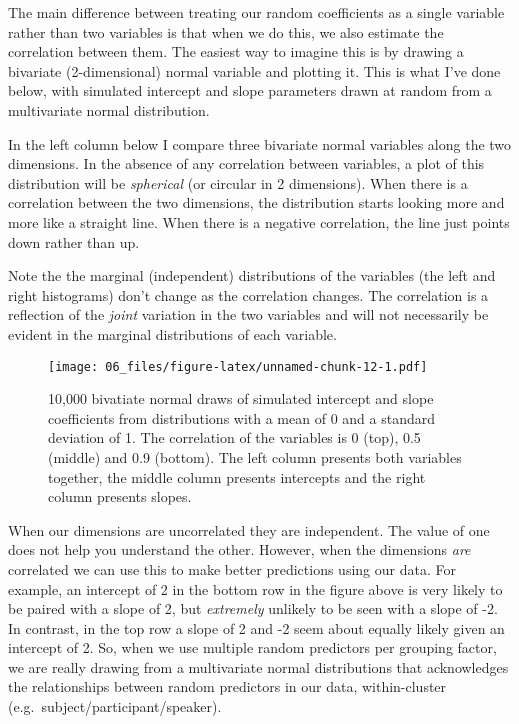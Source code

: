 \documentclass[
]{book}
\begin{document}
The main difference between treating our random coefficients as a single variable rather than two variables is that when we do this, we also estimate the correlation between them. The easiest way to imagine this is by drawing a bivariate (2-dimensional) normal variable and plotting it. This is what I've done below, with simulated intercept and slope parameters drawn at random from a multivariate normal distribution.

In the left column below I compare three bivariate normal variables along the two dimensions. In the absence of any correlation between variables, a plot of this distribution will be \emph{spherical} (or circular in 2 dimensions). When there is a correlation between the two dimensions, the distribution starts looking more and more like a straight line. When there is a negative correlation, the line just points down rather than up.

Note the the marginal (independent) distributions of the variables (the left and right histograms) don't change as the correlation changes. The correlation is a reflection of the \emph{joint} variation in the two variables and will not necessarily be evident in the marginal distributions of each variable.

\begin{figure}
\centering
\texttt{[image: 06\_files/figure-latex/unnamed-chunk-12-1.pdf]}
\caption{\label{fig:unnamed-chunk-12}10,000 bivatiate normal draws of simulated intercept and slope coefficients from distributions with a mean of 0 and a standard deviation of 1. The correlation of the variables is 0 (top), 0.5 (middle) and 0.9 (bottom). The left column presents both variables together, the middle column presents intercepts and the right column presents slopes.}
\end{figure}

When our dimensions are uncorrelated they are independent. The value of one does not help you understand the other. However, when the dimensions \emph{are} correlated we can use this to make better predictions using our data. For example, an intercept of 2 in the bottom row in the figure above is very likely to be paired with a slope of 2, but \emph{extremely} unlikely to be seen with a slope of -2. In contrast, in the top row a slope of 2 and -2 seem about equally likely given an intercept of 2. So, when we use multiple random predictors per grouping factor, we are really drawing from a multivariate normal distributions that acknowledges the relationships between random predictors in our data, within-cluster (e.g.~subject/participant/speaker).
\end{document}
